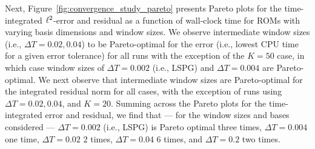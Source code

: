 Next, Figure~\ref{fig:convergence_study_pareto} presents Pareto plots for the time-integrated $\ell^2$-error and residual as a function of wall-clock time for ROMs with varying basis dimensions and window sizes. We observe intermediate window sizes (i.e., $\Delta T = 0.02,0.04$) to be Pareto-optimal for the error (i.e., lowest CPU time for a given error tolerance) for all runs with the exception of the $K=50$ case, in which case window sizes of $\Delta T = 0.002$ (i.e., LSPG) and $\Delta T = 0.004$ are Pareto-optimal. We next observe that intermediate window sizes are Pareto-optimal for the integrated residual norm for all cases, with the exception of runs using $\Delta T = 0.02, 0.04$, and $K=20$. Summing across the Pareto plots for the time-integrated error and residual, we find that --- for the window sizes and bases considered --- $\Delta T = 0.002$ (i.e., LSPG) is Pareto optimal three times, $\Delta T = 0.004$ one time, $\Delta T = 0.02$ 2 times, $\Delta T = 0.04$ 6 times, and $\Delta T = 0.2$ two times.  


